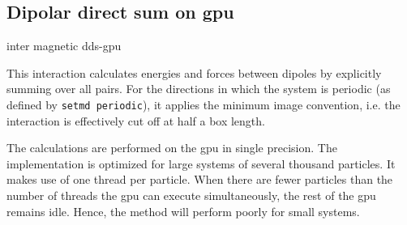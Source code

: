 \subsection{Dipolar direct sum on gpu}

\begin{essyntax}
  inter magnetic  dds-gpu
  \begin{features}
  \end{features}
\end{essyntax}

This interaction calculates energies and forces between dipoles by
explicitly summing over all pairs.  For the directions in which the
system is periodic (as defined by \texttt{setmd periodic}), it applies
the minimum image convention, i.e. the interaction is effectively cut
off at half a box length.

The calculations are performed on the gpu in single precision. The implementation is optimized for large systems of several thousand particles. It makes use of one thread per particle. When there are fewer particles than the number of threads the gpu can execute simultaneously, the rest of the gpu remains idle. Hence, the method will perform poorly for small systems.

